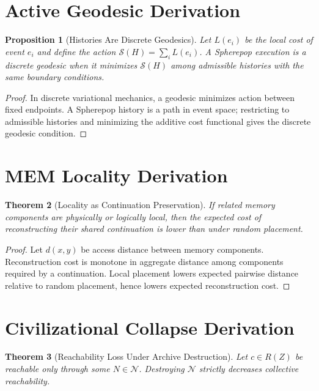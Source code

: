 \documentclass[12pt, a4paper, openany]{book}
\theoremstyle{plain}
\newtheorem{theorem}{Theorem}[chapter]
\newtheorem{proposition}[theorem]{Proposition}
\theoremstyle{definition}
\theoremstyle{remark}
\newcommand{\calN}{\mathcal{N}}
\begin{document}
\section{Active Geodesic Derivation}

\begin{proposition}[Histories Are Discrete Geodesics]
Let $L(e_i)$ be the local cost of event $e_i$ and define the action
$\mathcal{S}(H) = \sum_i L(e_i)$. A Spherepop execution is a discrete geodesic
when it minimizes $\mathcal{S}(H)$ among admissible histories with the same
boundary conditions.
\end{proposition}

\begin{proof}
In discrete variational mechanics, a geodesic minimizes action between fixed
endpoints. A Spherepop history is a path in event space; restricting to admissible
histories and minimizing the additive cost functional gives the discrete geodesic
condition.
\end{proof}

\section{MEM Locality Derivation}

\begin{theorem}[Locality as Continuation Preservation]
If related memory components are physically or logically local, then the expected
cost of reconstructing their shared continuation is lower than under random
placement.
\end{theorem}

\begin{proof}
Let $d(x, y)$ be access distance between memory components. Reconstruction cost
is monotone in aggregate distance among components required by a continuation.
Local placement lowers expected pairwise distance relative to random placement,
hence lowers expected reconstruction cost.
\end{proof}

\section{Civilizational Collapse Derivation}

\begin{theorem}[Reachability Loss Under Archive Destruction]
Let $c \in R(Z)$ be reachable only through some $N \in \calN$. Destroying $\calN$
strictly decreases collective reachability.
\end{theorem}
\end{document}

